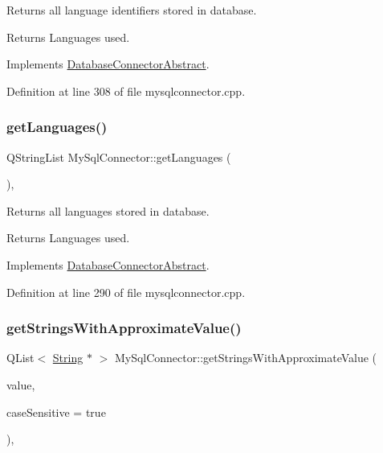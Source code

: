 Returns all language identifiers stored in database. 

\begin{DoxyReturn}{Returns}
Languages used. 
\end{DoxyReturn}


Implements \mbox{\hyperlink{classDatabaseConnectorAbstract_a98f5b2472bab6edc82ce2c5554319d7f}{Database\+Connector\+Abstract}}.



Definition at line 308 of file mysqlconnector.\+cpp.

\mbox{\label{classMySqlConnector_a83be1a4d67e509b6604629660eb7c4a0}} 
\subsubsection{\texorpdfstring{get\+Languages()}{getLanguages()}}
{\footnotesize\ttfamily Q\+String\+List My\+Sql\+Connector\+::get\+Languages (\begin{DoxyParamCaption}{ }\end{DoxyParamCaption})\hspace{0.3cm}{\ttfamily [override]}, {\ttfamily [virtual]}}



Returns all languages stored in database. 

\begin{DoxyReturn}{Returns}
Languages used. 
\end{DoxyReturn}


Implements \mbox{\hyperlink{classDatabaseConnectorAbstract_a77ff263d407366e54f3e8512c575ff5e}{Database\+Connector\+Abstract}}.



Definition at line 290 of file mysqlconnector.\+cpp.

\mbox{\label{classMySqlConnector_a8a480141c72dc8da687b15f921ab1a4e}} 
\subsubsection{\texorpdfstring{get\+Strings\+With\+Approximate\+Value()}{getStringsWithApproximateValue()}}
{\footnotesize\ttfamily Q\+List$<$ \mbox{\hyperlink{classString}{String}} $\ast$ $>$ My\+Sql\+Connector\+::get\+Strings\+With\+Approximate\+Value (\begin{DoxyParamCaption}\item[{const Q\+String \&}]{value,  }\item[{bool}]{case\+Sensitive = {\ttfamily true} }\end{DoxyParamCaption})\hspace{0.3cm}{\ttfamily [override]}, {\ttfamily [virtual]}}



